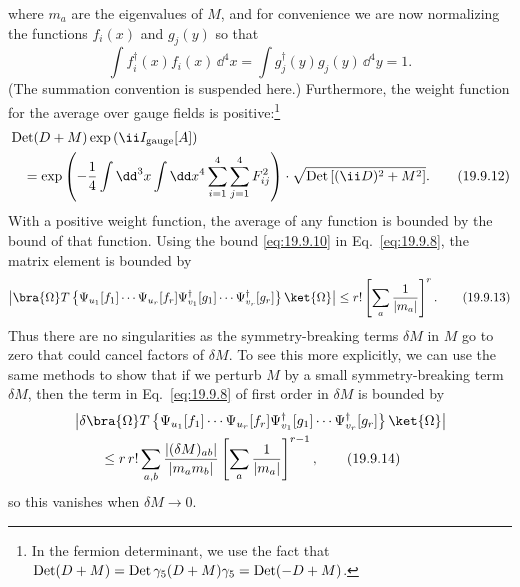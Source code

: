 where $m_a$ are the eigenvalues of $M$, and for convenience we are now normalizing the functions $f_i(x)$ and $g_j(y)$ so that
\begin{equation}
\int f_i^\dagger(x)f_i(x)\,\dd^4x
=\int g_j^\dagger(y)g_j(y)\,\dd^4y
=1.
\tag{19.9.11}\label{eq:19.9.11}
\end{equation}
(The summation convention is suspended here.) Furthermore, the weight function for the average over gauge fields is positive:\footnote{In the fermion determinant, we use the fact that $\operatorname{Det}(\sl{D}+M)=\operatorname{Det}\gamma_5(\sl{D}+M)\gamma_5=\operatorname{Det}(-\sl{D}+M)$.}
\begin{align}
&\operatorname{Det}(\sl{D}+M)
\exp\left(\ii I_{\mathrm{gauge}}[A]\right)
\notag\\
&\quad=
\exp\left(
-\frac{1}{4}\int \dd^3x\int \dd x^4
\sum_{i=1}^4\sum_{j=1}^4F_{ij}^2
\right)
\cdot
\sqrt{\operatorname{Det}\left[(\ii\sl{D})^2+M^2\right]}.
\tag{19.9.12}\label{eq:19.9.12}
\end{align}
With a positive weight function, the average of any function is bounded by the bound of that function. Using the bound \eqref{eq:19.9.10} in Eq.~\eqref{eq:19.9.8}, the matrix element is bounded by
\begin{align}
\left|
\bra{\Omega}T\left\{
\Psi_{u_1}[f_1]\cdots\Psi_{u_r}[f_r]
\Psi^\dagger_{v_1}[g_1]\cdots\Psi^\dagger_{v_r}[g_r]
\right\}\ket{\Omega}
\right|
\leq r!\left[\sum_a\frac{1}{|m_a|}\right]^r.
\tag{19.9.13}\label{eq:19.9.13}
\end{align}
Thus there are no singularities as the symmetry-breaking terms $\delta M$ in $M$ go to zero that could cancel factors of $\delta M$. To see this more explicitly, we can use the same methods to show that if we perturb $M$ by a small symmetry-breaking term $\delta M$, then the term in Eq.~\eqref{eq:19.9.8} of first order in $\delta M$ is bounded by
\begin{align}
&\left|
\delta\bra{\Omega}T\left\{
\Psi_{u_1}[f_1]\cdots\Psi_{u_r}[f_r]
\Psi^\dagger_{v_1}[g_1]\cdots\Psi^\dagger_{v_r}[g_r]
\right\}\ket{\Omega}
\right|
\notag\\
&\qquad\leq
r\,r!\sum_{a,b}
\frac{|(\delta M)_{ab}|}{|m_am_b|}
\left[\sum_a\frac{1}{|m_a|}\right]^{r-1},
\tag{19.9.14}\label{eq:19.9.14}
\end{align}
so this vanishes when $\delta M\to0$.

